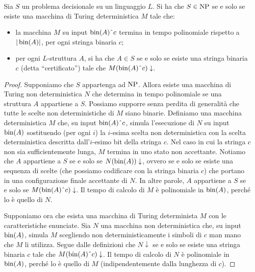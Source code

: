 \begin{proposizione}
  \label{prop:caratterizzazione-np}
  Sia $S$ un problema decisionale su un linguaggio $L$.
  Si ha che $S \in \operatorname{NP}$ se e solo se esiste una macchina di Turing deterministica $M$ tale che:
  \begin{itemize}
    \item la macchina $M$ su input $\bin(A)\string^ c$ termina in tempo polinomiale rispetto a $|\operatorname{bin}(A)|$, per ogni stringa binaria $c$;
    \item per ogni $L$-struttura $A$, si ha che $A\in S$ se e solo se esiste una stringa binaria $c$ (detta ``certificato'') tale che $M(\bin(A)\string^ c)\downarrow$.
  \end{itemize}
\end{proposizione}

\begin{proof}
  Supponiamo che $S$ appartenga ad $\operatorname{NP}$. Allora esiste una macchina di Turing non deterministica $N$ che determina in tempo polinomiale se una struttura $A$ appartiene a $S$.
  Possiamo supporre senza perdita di generalità che tutte le scelte non deterministiche di $M$ siano binarie.
  Definiamo una macchina deterministica $M$ che, su input $\bin(A)\string^ c$, simula l'esecuzione di $N$ su input $\operatorname{bin}(A)$ sostituendo (per ogni $i$) la $i$-esima scelta non deterministica con la scelta deterministica descritta dall'$i$-esimo bit della stringa $c$. Nel caso in cui la stringa $c$ non sia sufficientemente lunga, $M$ termina in uno stato non accettante.
  Notiamo che $A$ appartiene a $S$ se e solo se $N(\operatorname{bin}(A))\downarrow$, ovvero se e solo se esiste una sequenza di scelte (che possiamo codificare con la stringa binaria $c$) che portano in una configurazione finale accettante di $N$. In altre parole, $A$ appartiene a $S$ se e solo se $M(\bin(A)\string^c)\downarrow$.
  Il tempo di calcolo di $M$ è polinomiale in $\operatorname{bin}(A)$, perché lo è quello di $N$.
  
  Supponiamo ora che esista una macchina di Turing determinista $M$ con le caratteristiche enunciate.
  Sia $N$ una macchina non deterministica che, su input $\operatorname{bin}(A)$, simula $M$ scegliendo non deterministicamente i simboli di $c$ man mano che $M$ li utilizza.
  Segue dalle definizioni che $N\downarrow$ se e solo se esiste una stringa binaria $c$ tale che $M(\bin(A)\string^c)\downarrow$.
  Il tempo di calcolo di $N$ è polinomiale in $\operatorname{bin}(A)$, perché lo è quello di $M$ (indipendentemente dalla lunghezza di $c$).
\end{proof}

